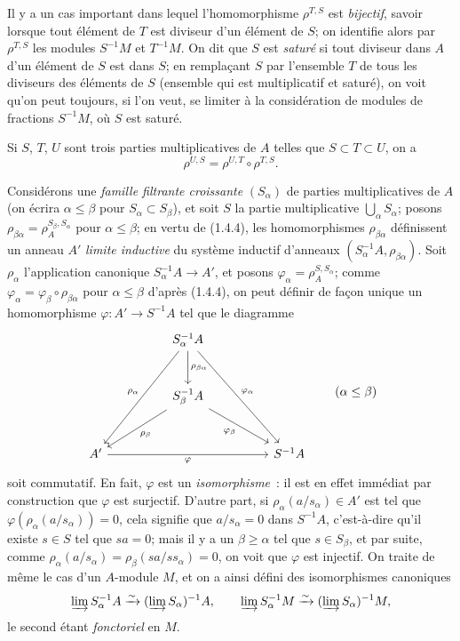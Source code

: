 \begin{env}[1.4.3]
\label{0.1.4.3-fr}
Il y a un cas important dans lequel l'homomorphisme $\rho^{T,S}$ est \emph{bijectif}, savoir lorsque tout élément de $T$ est diviseur d'un élément de $S$; on identifie alors par $\rho^{T,S}$ les modules $S^{-1}M$ et $T^{-1}M$.
On dit que $S$ est \emph{saturé} si tout diviseur dans $A$ d'un élément de $S$ est dans $S$; en remplaçant $S$ par l'ensemble $T$ de tous les diviseurs des éléments de $S$ (ensemble qui est multiplicatif et saturé), on voit qu'on peut toujours, si l'on veut, se limiter à la considération de modules de fractions $S^{-1}M$, où $S$ est saturé.
\end{env}

\begin{env}[1.4.4]
\label{0.1.4.4-fr}
Si $S$, $T$, $U$ sont trois parties multiplicatives de $A$ telles que $S\subset T\subset U$, on a
\[
  \rho^{U,S}=\rho^{U,T}\circ\rho^{T,S}.
\]
\end{env}

\begin{env}[1.4.5]
\label{0.1.4.5-fr}
Considérons une \emph{famille filtrante croissante} $(S_\alpha)$ de parties multiplicatives de $A$ (on écrira $\alpha\leq\beta$ pour $S_\alpha\subset S_\beta$), et soit $S$ la partie multiplicative $\bigcup_\alpha S_\alpha$; posons
$\rho_{\beta\alpha}=\rho_A^{S_\beta,S_\alpha}$ pour $\alpha\leq\beta$;
en vertu de (1.4.4), les homomorphismes $\rho_{\beta\alpha}$ définissent un anneau $A'$ \emph{limite inductive} du système inductif d'anneaux $(S_\alpha^{-1}A,\rho_{\beta\alpha})$.
Soit $\rho_\alpha$ l'application canonique $S_\alpha^{-1}A\to A'$, et posons $\varphi_\alpha=\rho_A^{S,S_\alpha}$; comme $\varphi_\alpha=\varphi_\beta\circ\rho_{\beta\alpha}$ pour $\alpha\leq\beta$ d'après (1.4.4), on peut définir de façon unique un homomorphisme $\varphi:A'\to S^{-1}A$ tel que le diagramme
\[
\begin{tikzcd}[column sep=huge,row sep=large]
  & S_\alpha^{-1}A
      \arrow[ddl,"\rho_\alpha"']
      \arrow[d,"\rho_{\beta\alpha}"]
      \arrow[ddr,"\varphi_\alpha"] & \\
  & S_\beta^{-1}A
      \arrow[dl,"\rho_\beta"]
      \arrow[dr,"\varphi_\beta"'] & \\
A' \arrow[rr,"\varphi"'] & & S^{-1}A
\end{tikzcd}
\qquad(\alpha\leq\beta)
\]
soit commutatif.
En fait, $\varphi$ est un \emph{isomorphisme}~: il est en effet immédiat par construction que $\varphi$ est surjectif.
D'autre part, si $\rho_\alpha(a/s_\alpha)\in A'$ est tel que $\varphi(\rho_\alpha(a/s_\alpha))=0$, cela signifie que $a/s_\alpha=0$ dans $S^{-1}A$, c'est-à-dire qu'il existe $s\in S$ tel que $sa=0$; mais il y a un $\beta\geq\alpha$ tel que $s\in S_\beta$, et par suite, comme $\rho_\alpha(a/s_\alpha)=\rho_\beta(sa/ss_\alpha)=0$, on voit que $\varphi$ est injectif.
On traite de même le cas d'un $A$-module $M$, et on a ainsi défini des isomorphismes canoniques
\[
  \varinjlim S_\alpha^{-1}A\xrightarrow{\sim}
  (\varinjlim S_\alpha)^{-1}A,
  \qquad
  \varinjlim S_\alpha^{-1}M\xrightarrow{\sim}
  (\varinjlim S_\alpha)^{-1}M,
\]
le second étant \emph{fonctoriel} en $M$.
\end{env}


